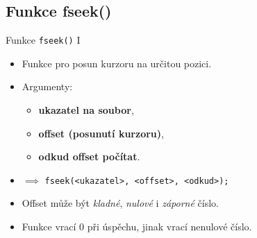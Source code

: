 \documentclass[14pt,aspectratio=169]{beamer}
\begin{document}
    \subsection{Funkce fseek()}
    \begin{frame}[t]{Funkce \texttt{fseek()} \textrm{I}}
        \begin{itemize}
            \item Funkce pro posun kurzoru na určitou pozici.
            \item Argumenty:
            \begin{itemize}
                \item \textbf{ukazatel na soubor},
                \item \textbf{offset (posunutí kurzoru)},
                \item \textbf{odkud offset počítat}.
            \end{itemize}
            \item $\implies$ \texttt{fseek(<ukazatel>, <offset>, <odkud>);}
            \item Offset může být \emph{kladné}, \emph{nulové} i \emph{záporné} číslo.
            \item Funkce vrací $0$ při úspěchu, jinak vrací nenulové číslo.
        \end{itemize}
    \end{frame}
\end{document}
